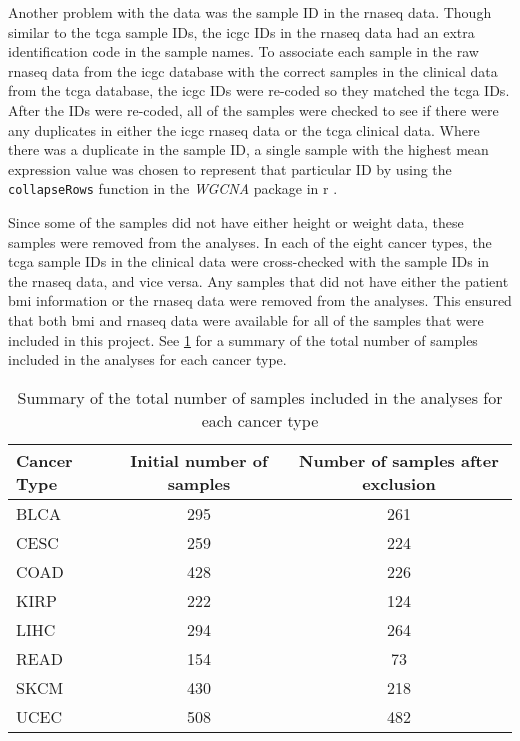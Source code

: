 Another problem with the data was the sample ID in the \gls{rnaseq} data.
Though similar to the \gls{tcga} sample IDs, the \gls{icgc} IDs in the \gls{rnaseq} data had an extra identification code in the sample names.
To associate each sample in the raw \gls{rnaseq} data from the \gls{icgc} database with the correct samples in the clinical data from the \gls{tcga} database, the \gls{icgc} IDs were re-coded so they matched the \gls{tcga} IDs.
After the IDs were re-coded, all of the samples were checked to see if there were any duplicates in either the \gls{icgc} \gls{rnaseq} data or the \gls{tcga} clinical data.
Where there was a duplicate in the sample ID, a single sample with the highest mean expression value was chosen to represent that particular ID by using the \texttt{collapseRows} function in the \textit{WGCNA} package in \gls{r} \citep{Langfelder2008}.

Since some of the samples did not have either height or weight data, these samples were removed from the analyses.
In each of the eight cancer types, the \gls{tcga} sample IDs in the clinical data were cross-checked with the sample IDs in the \gls{rnaseq} data, and vice versa.
Any samples that did not have either the patient \gls{bmi} information or the \gls{rnaseq} data were removed from the analyses.
This ensured that both \gls{bmi} and \gls{rnaseq} data were available for all of the samples that were included in this project.
See \cref{tab:samplesize} for a summary of the total number of samples included in the analyses for each cancer type.

\begin{table}[htpb]
	\caption{Summary of the total number of samples included in the analyses for each cancer type}
	\label{tab:samplesize}
	\begin{center}
		\begin{tabular}{lcc}
			Cancer Type   & Initial number of samples & Number of samples after exclusion\\
			\hline
			\hline
			\rule{0pt}{2.25ex}BLCA & 295 & 261   \\
			CESC                   & 259 & 224   \\
			COAD                   & 428 & 226   \\
			KIRP                   & 222 & 124   \\
			LIHC                   & 294 & 264   \\
			READ                   & 154 & 73    \\
			SKCM                   & 430 & 218   \\
			UCEC                   & 508 & 482   \\
			\hline
			\hline
		\end{tabular}
	\end{center}
\end{table}

